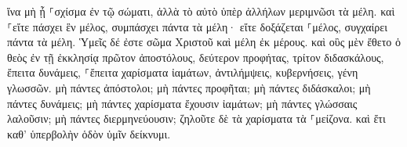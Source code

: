 \documentclass{openreader}
\begin{document}
ἵνα μὴ ᾖ ⸀σχίσμα ἐν τῷ σώματι, ἀλλὰ τὸ αὐτὸ ὑπὲρ ἀλλήλων μεριμνῶσι τὰ μέλη. 
καὶ ⸀εἴτε πάσχει ἓν μέλος, συμπάσχει πάντα τὰ μέλη· εἴτε δοξάζεται ⸀μέλος, συγχαίρει πάντα τὰ μέλη. 
Ὑμεῖς δέ ἐστε σῶμα Χριστοῦ καὶ μέλη ἐκ μέρους. 
καὶ οὓς μὲν ἔθετο ὁ θεὸς ἐν τῇ ἐκκλησίᾳ πρῶτον ἀποστόλους, δεύτερον προφήτας, τρίτον διδασκάλους, ἔπειτα δυνάμεις, ⸀ἔπειτα χαρίσματα ἰαμάτων, ἀντιλήμψεις, κυβερνήσεις, γένη γλωσσῶν. 
μὴ πάντες ἀπόστολοι; μὴ πάντες προφῆται; μὴ πάντες διδάσκαλοι; μὴ πάντες δυνάμεις; 
μὴ πάντες χαρίσματα ἔχουσιν ἰαμάτων; μὴ πάντες γλώσσαις λαλοῦσιν; μὴ πάντες διερμηνεύουσιν; 
ζηλοῦτε δὲ τὰ χαρίσματα τὰ ⸀μείζονα. καὶ ἔτι καθ’ ὑπερβολὴν ὁδὸν ὑμῖν δείκνυμι. 
\end{document}
